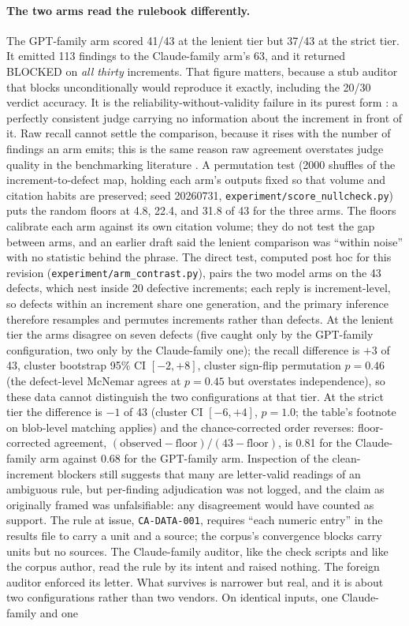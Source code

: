\documentclass[11pt,letterpaper]{article}
\newcommand{\rulename}[1]{\texttt{#1}}
\begin{document}
\paragraph{The two arms read the rulebook differently.} The GPT-family arm scored 41/43 at the lenient tier but 37/43 at the strict tier. It emitted 113 findings to the Claude-family arm's 63, and it returned BLOCKED on \emph{all thirty} increments. That figure matters, because a stub auditor that blocks unconditionally would reproduce it exactly, including the 20/30 verdict accuracy. It is the reliability-without-validity failure in its purest form \cite{norman2026reliability}: a perfectly consistent judge carrying no information about the increment in front of it. Raw recall cannot settle the comparison, because it rises with the number of findings an arm emits; this is the same reason raw agreement overstates judge quality in the benchmarking literature \cite{norman2026reliability}. A permutation test (2000 shuffles of the increment-to-defect map, holding each arm's outputs fixed so that volume and citation habits are preserved; seed 20260731, \texttt{experiment/score\_nullcheck.py}) puts the random floors at 4.8, 22.4, and 31.8 of 43 for the three arms. The floors calibrate each arm against its own citation volume; they do not test the gap between arms, and an earlier draft said the lenient comparison was ``within noise'' with no statistic behind the phrase. The direct test, computed post hoc for this revision (\texttt{experiment/arm\_contrast.py}), pairs the two model arms on the 43 defects, which nest inside 20 defective increments; each reply is increment-level, so defects within an increment share one generation, and the primary inference therefore resamples and permutes increments rather than defects. At the lenient tier the arms disagree on seven defects (five caught only by the GPT-family configuration, two only by the Claude-family one); the recall difference is $+3$ of 43, cluster bootstrap 95\% CI $[-2, +8]$, cluster sign-flip permutation $p=0.46$ (the defect-level McNemar agrees at $p=0.45$ but overstates independence), so these data cannot distinguish the two configurations at that tier. At the strict tier the difference is $-1$ of 43 (cluster CI $[-6, +4]$, $p=1.0$; the table's footnote on blob-level matching applies) and the chance-corrected order reverses: floor-corrected agreement, $(\mathrm{observed}-\mathrm{floor})/(43-\mathrm{floor})$, is 0.81 for the Claude-family arm against 0.68 for the GPT-family arm. Inspection of the clean-increment blockers still suggests that many are letter-valid readings of an ambiguous rule, but per-finding adjudication was not logged, and the claim as originally framed was unfalsifiable: any disagreement would have counted as support. The rule at issue, \rulename{CA-DATA-001}, requires ``each numeric entry'' in the results file to carry a unit and a source; the corpus's convergence blocks carry units but no sources. The Claude-family auditor, like the check scripts and like the corpus author, read the rule by its intent and raised nothing. The foreign auditor enforced its letter. What survives is narrower but real, and it is about two configurations rather than two vendors. On identical inputs, one Claude-family and one 
\end{document}

